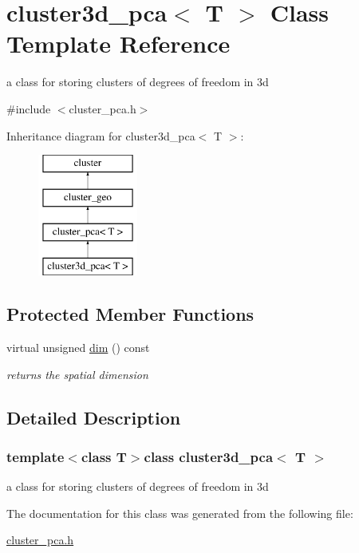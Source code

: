 \hypertarget{classcluster3d__pca}{
\section{cluster3d\-\_\-pca$<$ \-T $>$ \-Class \-Template \-Reference}
\label{classcluster3d__pca}
}


a class for storing clusters of degrees of freedom in 3d  




{\ttfamily \#include $<$cluster\-\_\-pca.\-h$>$}

\-Inheritance diagram for cluster3d\-\_\-pca$<$ \-T $>$\-:\begin{figure}[H]
\begin{center}
\leavevmode
\includegraphics[height=4.000000cm]{classcluster3d__pca}
\end{center}
\end{figure}
\subsection*{\-Protected \-Member \-Functions}
\begin{DoxyCompactItemize}
\item 
\hypertarget{classcluster3d__pca_ad8e00a2e23452c2f4a52c815e5110770}{
virtual unsigned \hyperlink{classcluster3d__pca_ad8e00a2e23452c2f4a52c815e5110770}{dim} () const }
\label{classcluster3d__pca_ad8e00a2e23452c2f4a52c815e5110770}

\begin{DoxyCompactList}\small\item\em returns the spatial dimension \end{DoxyCompactList}\end{DoxyCompactItemize}


\subsection{\-Detailed \-Description}
\subsubsection*{template$<$class \-T$>$class cluster3d\-\_\-pca$<$ T $>$}

a class for storing clusters of degrees of freedom in 3d 

\-The documentation for this class was generated from the following file\-:\begin{DoxyCompactItemize}
\item 
\hyperlink{cluster__pca_8h}{cluster\-\_\-pca.\-h}\end{DoxyCompactItemize}
